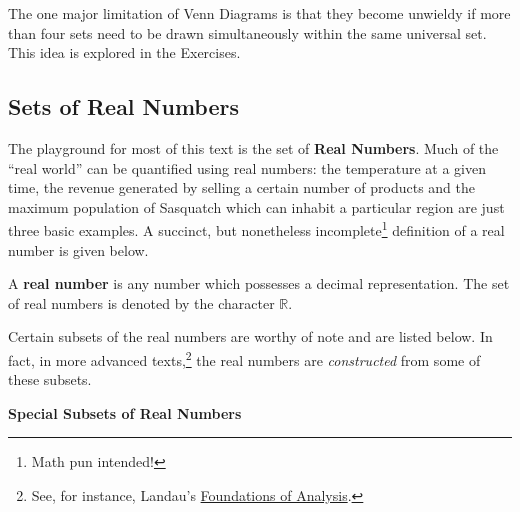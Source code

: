 \documentclass{ximera}
\begin{document}
The one major limitation of Venn Diagrams is that they become unwieldy if more than four sets need to be drawn simultaneously within the same universal set.  This idea is explored in the Exercises.

\subsection{Sets of Real Numbers}
\label{SetsofRealNumbers}

The playground for most of this text is the set of \textbf{Real Numbers}.  Much of the ``real world'' can be quantified using real numbers: the temperature at a given time, the revenue generated by selling a certain number of products and the maximum population of Sasquatch which can inhabit a particular region are just three basic examples.   A succinct, but nonetheless incomplete\footnote{Math pun intended!} definition of a real number is given below.

 


\begin{definition} \label{realnumberdefn}

A \textbf{real number} is any number which possesses a decimal representation.  The set of real numbers is denoted by the character $\mathbb{R}$.  

\end{definition}


 

Certain subsets of the real numbers are worthy of note and are listed below.  In fact, in more advanced texts,\footnote{See, for instance, Landau's \underline{Foundations of Analysis}.}   the real numbers are \textit{constructed} from some of these subsets.  

 

\label{setsofnumbersboxonthispage}


\centerline{\textbf{Special Subsets of Real Numbers}}
\end{document}
